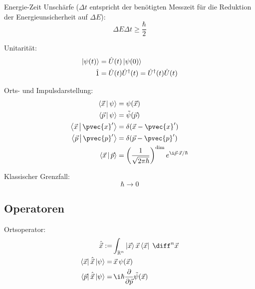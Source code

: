 \documentclass[11pt]{article}
\numberwithin{equation}{section}
\begin{document}
      Energie-Zeit Unschärfe ($\Delta t$ entspricht der benötigten Messzeit für die Reduktion der Energieunsicherheit auf $\Delta E$):
      \begin{equation}
        \Delta E \Delta t \ge \frac{\hbar}{2}
      \end{equation}

      Unitarität:
      \begin{equation}
        \begin{aligned}
          \Ket{\psi(t)} &= \hat{U}(t) \Ket{\psi(0)} \\
          \hat{1} &= \hat{U}(t)\hat{U}^\dagger(t) = \hat{U}^\dagger(t)\hat{U}(t) \\
        \end{aligned}
      \end{equation}

      Orts- und Impulsdarstellung:
      \begin{equation}
        \begin{aligned}
          \Braket{\vec{x} | \psi} &= \psi(\vec{x}) \\
          \Braket{\vec{p} | \psi} &= \tilde{\psi}(\vec{p}) \\
          \Braket{\vec{x} | \pvec{x}'} &= \delta(\vec{x} - \pvec{x}') \\
          \Braket{\vec{p} | \pvec{p}'} &= \delta(\vec{p} - \pvec{p}') \\
          \Braket{\vec{x} | \vec{p}} &= \left( \frac{1}{\sqrt{2\pi\hbar}} \right)^\mathrm{dim} e^{\i \vec{p}\cdot\vec{x} / \hbar} \\
        \end{aligned}
      \end{equation}

      Klassischer Grenzfall:
      \begin{equation}
        \hbar \rightarrow 0
      \end{equation}

    \subsection{Operatoren}
      Ortsoperator:
      \begin{equation}
        \begin{aligned}
          \hat{\vec{x}} :=& \int_{\mathbb{R}^n} \Ket{\vec{x}} \vec{x} \Bra{\vec{x}}\;\diff^n\vec{x} \\
          \Bra{\vec{x}}\hat{\vec{x}}\Ket{\psi} =& \,\vec{x}\, \psi(\vec{x}) \\
          \Bra{\vec{p}}\hat{\vec{x}}\Ket{\psi} =& \,\i\hbar\pder{}{\vec{p}}\tilde{\psi}(\vec{x}) \\
        \end{aligned}
      \end{equation}
\end{document}
